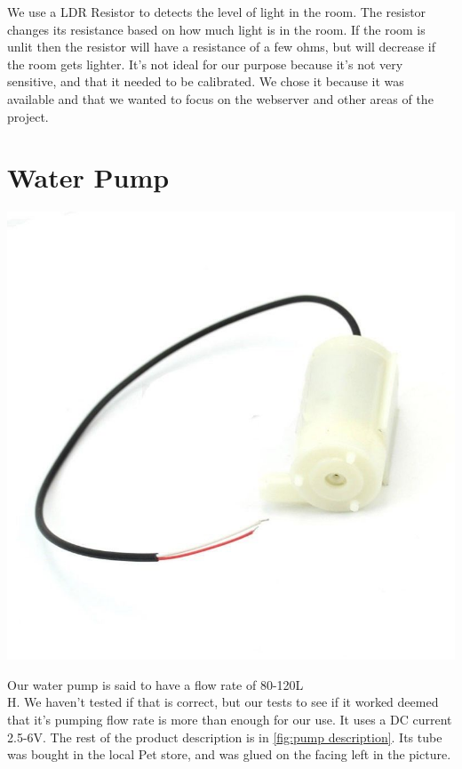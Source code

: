 \documentclass[a4paper,12pt,twoside,openright,titlepage]{book}
\begin{document}
We use a LDR Resistor to detects the level of light in the room. The resistor changes its resistance based on how much light is in the room. If the room is unlit then the resistor will have a resistance of a few ohms, but will decrease if the room gets lighter. It's not ideal for our purpose because it's not very sensitive, and that it needed to be calibrated. We chose it because it was available and that we wanted to focus on the webserver and other areas of the project.

\section{Water Pump}
\begin{center}
	\includegraphics[scale=0.3]{Water-Pump}
\end{center}

Our water pump is said to have a flow rate of 80-120L\\H. We haven't tested if that is correct, but our tests to see if it worked deemed that it's pumping flow rate is more than enough for our use. It uses a DC current 2.5-6V. The rest of the product description is in \ref{fig:pump description}. Its tube was bought in the local Pet store, and was glued on the facing  left in the picture.
\end{document}
